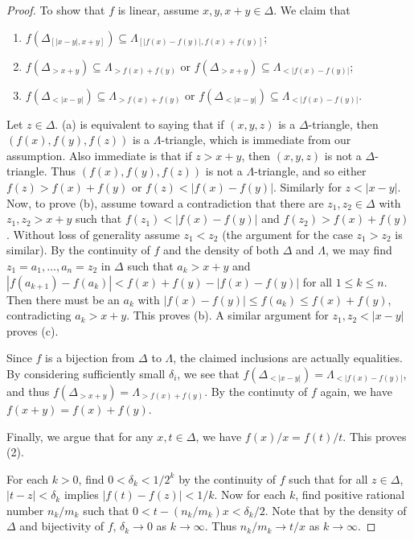 \documentclass[10pt,a4paper]{amsart}
\theoremstyle{definition}
\theoremstyle{remark}
\begin{document}
\begin{proof}
To show that $f$ is linear, assume $x,y,x+y\in \Delta$. We claim that
\begin{enumerate}
\item[(a)] $f(\Delta_{[|x-y|, x+y]}) \subseteq \Lambda_{[|f(x)-f(y)|, f(x)+f(y)]}$; 
\item[(b)] $f(\Delta_{>x+y}) \subseteq \Lambda_{>f(x)+f(y)}  \mbox{ or } f(\Delta_{>x+y})\subseteq \Lambda_{<|f(x)-f(y)|}$;
\item[(c)] $f(\Delta_{<|x-y|}) \subseteq \Lambda_{>f(x)+f(y)} \mbox{ or } f(\Delta_{<|x-y|})\subseteq \Lambda_{<|f(x)-f(y)|}$. 
\end{enumerate}
Let $z\in \Delta$. (a) is equivalent to saying that if $(x,y,z)$ is a $\Delta$-triangle, then $(f(x), f(y), f(z))$ is a $\Lambda$-triangle, which is immediate from our assumption. Also immediate is that if $z > x+y$, then $(x,y,z)$ is not a $\Delta$-triangle. Thus $(f(x),f(y),f(z))$ is not a $\Lambda$-triangle, and so either $f(z) > f(x)+f(y)$ or $f(z) < |f(x)-f(y)|$. Similarly for $z <|x-y|$. Now, to prove (b), assume toward a contradiction that there are $z_1, z_2\in \Delta$ with $z_1, z_2 >x+y$ such that $f(z_1)<|f(x)-f(y)|$ and $f(z_2)>f(x)+f(y)$. Without loss of generality assume $z_1<z_2$ (the argument for the case $z_1>z_2$ is similar). By the continuity of $f$ and the density of both $\Delta$ and $\Lambda$, we may find $z_1=a_1,\dots, a_n=z_2$ in $\Delta$ such that $a_k>x+y$ and $|f(a_{k+1})-f(a_k)| < f(x)+f(y)-|f(x)-f(y)|$ for all $1\leq k\leq n$. Then there must be an $a_k$ with $|f(x)-f(y)| \leq f(a_k) \leq f(x)+f(y)$, contradicting $a_k>x+y$. This proves (b). A similar argument for $z_1, z_2 < |x-y|$ proves (c). 

        Since $f$ is a bijection from $\Delta$ to $\Lambda$, the claimed inclusions are actually equalities. By considering sufficiently small $\delta_i$, we see that $f(\Delta_{<|x-y|}) = \Lambda_{<|f(x)-f(y)|}$, and thus $f(\Delta_{>x+y}) = \Lambda_{>f(x)+f(y)}$. By the continuty of $f$ again, we have $f(x+y) =f(x)+f(y)$.   
   
Finally, we argue that for any $x,t \in \Delta$, we have $f(x)/x=f(t)/t$. This proves (2). 


    For each $k > 0 $, find $0< \delta_k < 1/2^k$ by the continuity of $f$ such that for all $z\in \Delta$, $|t-z|<\delta_k$ implies $|f(t)-f(z)| < 1/k$. Now for each $k$, find positive rational number $n_k/m_k$ such that $0< t-(n_k/m_k)x < \delta_k/2$. Note that by the density of $\Delta$ and bijectivity of $f$, $\delta_k \to 0$ as $k \to \infty$. Thus $n_k/m_k \to t/x$ as $k \to \infty$. 


\end{proof}
\end{document}
